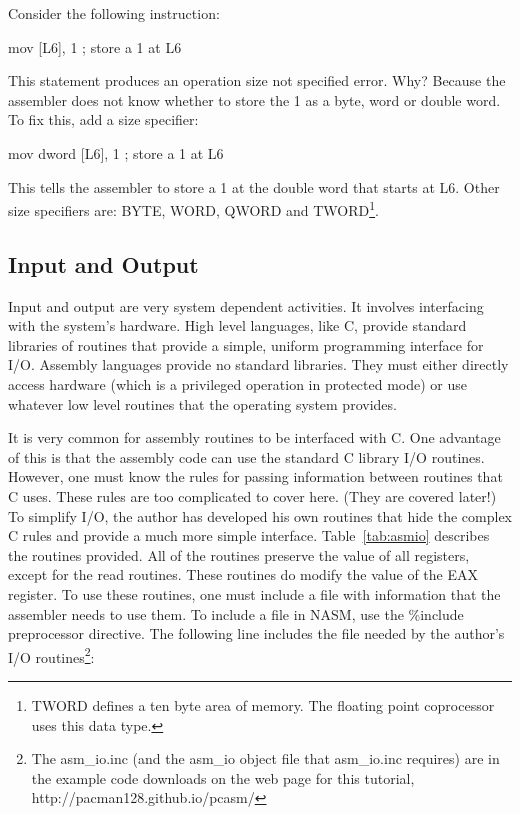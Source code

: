 Consider the following instruction:
\begin{AsmCodeListing}[frame=none, numbers=none]
      mov    [L6], 1             ; store a 1 at L6
\end{AsmCodeListing}
This statement produces an {\code operation size not specified} error. Why?
Because the assembler does not know whether to store the 1 as a byte, word
or double word. To fix this, add a size specifier:
\begin{AsmCodeListing}[frame=none, numbers=none]
      mov    dword [L6], 1       ; store a 1 at L6
\end{AsmCodeListing}
This tells the assembler to store a 1 at the double word that starts at
{\code L6}. Other size specifiers are: {\code BYTE}, {\code WORD},
{\code QWORD} and {\code TWORD}\footnote{{\code TWORD} defines a ten byte
area of memory. The floating point coprocessor uses this data type.}.

\subsection{Input and Output }

Input and output are very system dependent activities. It involves
interfacing with the system's hardware. High level languages, like C,
provide standard libraries of routines that provide a simple, uniform
programming interface for I/O.  Assembly languages provide no standard
libraries. They must either directly access hardware (which is a privileged
operation in protected mode) or use whatever low level routines that the
operating system provides.

It is very common for assembly routines to be interfaced with C. One
advantage of this is that the assembly code can use the standard C
library I/O routines.  However, one must know the rules for passing
information between routines that C uses. These rules are too
complicated to cover here. (They are covered later!) To simplify I/O,
the author has developed his own routines that hide the complex C
rules and provide a much more simple interface.  Table~\ref{tab:asmio}
describes the routines provided. All of the routines preserve the
value of all registers, except for the read routines. These routines
do modify the value of the EAX register. To use these routines, one
must include a file with information that the assembler needs to use
them.  To include a file in NASM, use the {\code \%include}
preprocessor directive. The following line includes the file needed by
the author's I/O routines\footnote{The {\code asm\_io.inc} (and the
{\code asm\_io} object file that {\code asm\_io.inc} requires) are in
the example code downloads on the web page for this tutorial, {\code
http://pacman128.github.io/pcasm/}}:
\begin{AsmCodeListing}[frame=none, numbers=none]
\end{AsmCodeListing}

